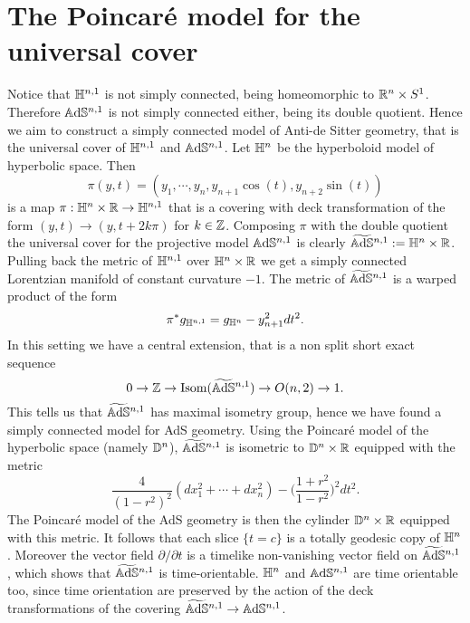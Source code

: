 \section{The Poincaré model for the universal cover}
Notice that $\mathbb{H}^{n,1}$ is not simply connected, being homeomorphic to $\mathbb{R}^n \times S^1$. Therefore $\mathbb{A}\mathrm{d}\mathbb{S}^{n,1}$ is not simply connected either, being its double quotient.
Hence we aim to construct a simply connected model of Anti-de Sitter geometry, that is the universal cover of $\mathbb{H}^{n,1}$ and $\mathbb{A}\mathrm{d}\mathbb{S}^{n,1}$.
Let $\mathbb{H}^n$ be the hyperboloid model of hyperbolic space. Then
\[
\pi(y,t) = (y_1 , \cdots , y_n, y_{n+1} \cos(t) , y_{n+2} \sin(t))
\]
is a map $\pi : \mathbb{H}^n \times \mathbb{R} \to \mathbb{H}^{n,1}$ that is a covering with deck transformation of the form $(y,t) \to (y, t+2k\pi)$ for $k \in \mathbb{Z}$. Composing $\pi$ with the double quotient the universal cover for the projective model $\mathbb{A}\mathrm{d}\mathbb{S}^{n,1}$ is clearly  $\widetilde{\mathbb{A}\mathrm{d}\mathbb{S}}{} ^{n,1} :=  \mathbb{H}^n \times \mathbb{R}$.\\
Pulling back the metric of $\mathbb{H}^{n,1}$ over $\mathbb{H}^n \times \mathbb{R}$ we get a simply connected Lorentzian manifold of constant curvature $-1$.
The metric of $\widetilde{\mathbb{A}\mathrm{d}\mathbb{S}}{}^{n,1}$ is a warped product of the form
\[
    \pi^*g_{\mathbb{H}^{n,1}}= g_{\mathbb{H}^n} - y^2_{n+1}dt^2.
\]
In this setting we have a central extension, that is a non split short exact sequence
\[
    0 \to \mathbb{Z} \to \text{Isom}(\widetilde{\mathbb{A}\mathrm{d}\mathbb{S}}{}^{n,1}) \to O(n,2) \to 1.
\]
This tells us that $\widetilde{\mathbb{A}\mathrm{d}\mathbb{S}}{}^{n,1}$ has maximal isometry group, hence we have found a simply connected model for AdS geometry.
Using the Poincaré model of the hyperbolic space (namely $\mathbb{D}^n$), $\widetilde{\mathbb{A}\mathrm{d}\mathbb{S}}{}^{n,1}$ is isometric to $\mathbb{D}^n \times \mathbb{R}$ equipped with the metric
\[
    \frac{4}{(1-r^2)^2} (dx_1^2 + \cdots + dx_n^2) - \Big( \frac{1+r^2}{1-r^2} \Big)^2 dt^2.
\]
The Poincaré model of the AdS geometry is then the cylinder $\mathbb{D}^n \times \mathbb{R}$ equipped with this metric.
It follows that each slice $\{ t=c \}$ is a totally geodesic copy of $\mathbb{H}^n$. Moreover the vector field $\partial / \partial t$ is a timelike non-vanishing vector field on $\widetilde{\mathbb{A}\mathrm{d}\mathbb{S}}{}^{n,1}$, which shows that $\widetilde{\mathbb{A}\mathrm{d}\mathbb{S}}{}^{n,1}$ is time-orientable. $\mathbb{H}^n$ and $\mathbb{A}\mathrm{d}\mathbb{S}^{n,1}$ are time orientable too, since time orientation are preserved by the action of the deck transformations of the covering $\widetilde{\mathbb{A}\mathrm{d}\mathbb{S}}{}^{n,1} \to \mathbb{A}\mathrm{d}\mathbb{S}^{n,1}$.

